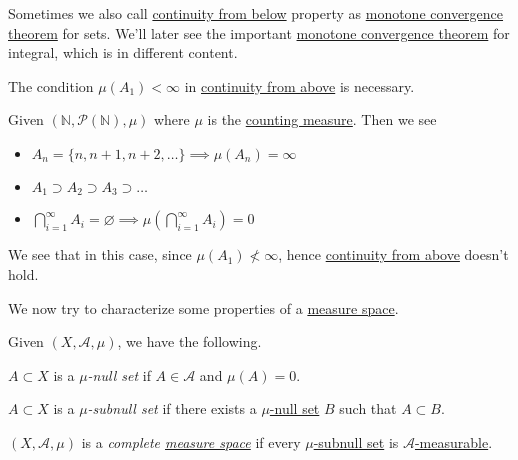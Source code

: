 \begin{note}
	Sometimes we also call \hyperref[thm:measure-space-continuity-from-below]{continuity from below} property as \underline{monotone convergence theorem} for sets. We'll later see
	the important \hyperref[thm:MCT]{monotone convergence theorem} for integral, which is in different content.
\end{note}
\begin{remark}
	The condition \(\mu (A_1) < \infty \) in \hyperref[thm:measure-space-continuity-from-above]{continuity from above} is necessary.
\end{remark}
\begin{explanation}
	Given \(\left(\mathbb{N}, \mathcal{P} (\mathbb{N}), \mu \right)\) where \(\mu\) is the \hyperref[eg:counting-measure]{counting measure}.
	Then we see
	\begin{itemize}
		\item \(A_{n} = \{n, n+1, n+2, \dots  \} \implies \mu(A_{n}) = \infty \)
		\item \(A_1 \supset A_2\supset A_3\supset \dots  \)
		\item \(\bigcap_{i=1}^{\infty} A_{i} = \varnothing \implies \mu\left(\bigcap_{i=1}^{\infty} A_{i}\right) = 0\)
	\end{itemize}
	We see that in this case, since \(\mu(A_1)\nless \infty \), hence \hyperref[thm:measure-space-continuity-from-above]{continuity from above} doesn't hold.
\end{explanation}

We now try to characterize some properties of a \hyperref[def:measure-space]{measure space}.
\begin{definition*}
	Given \((X, \mathcal{A} , \mu)\), we have the following.
	\begin{definition}\label{def:mu-null-set}
		\(A\subset X\) is a \emph{\(\mu\)-null set} if \(A\in \mathcal{A} \) and \(\mu(A) = 0\).
	\end{definition}
	\begin{definition}\label{def:mu-subnull-set}
		\(A\subset X\) is a \emph{\(\mu\)-subnull set} if there exists a \hyperref[def:mu-null-set]{\(\mu\)-null set} \(B\)
		such that \(A\subset B\).
	\end{definition}
	\begin{definition}\label{def:complete-measure-space}
		\((X, \mathcal{A} , \mu)\) is a \emph{complete \hyperref[def:measure-space]{measure space}} if every
		\hyperref[def:mu-subnull-set]{\(\mu\)-subnull set} is \hyperref[def:measurable-set]{\(\mathcal{A}\)-measurable}.
	\end{definition}
\end{definition*}

